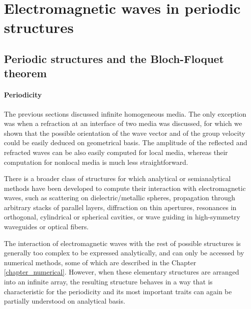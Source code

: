 
\section{Electromagnetic waves in periodic structures}
\subsection{Periodic structures and the Bloch-Floquet theorem}
\paragraph{Periodicity}%
The previous sections discussed infinite homogeneous media. The only exception was when a refraction at an interface of two media was discussed, for which we shown that the possible orientation of the wave vector and of the group velocity could be easily deduced on geometrical basis. The amplitude of the reflected and refracted waves can be also easily computed for local media, whereas their computation for nonlocal media is much less straightforward. 

There is a broader class of structures for which analytical or semianalytical methods have been developed to compute their interaction with electromagnetic waves, such as scattering on dielectric/metallic spheres, propagation through arbitrary stacks of parallel layers, diffraction on thin apertures, resonances in orthogonal, cylindrical or spherical cavities, or wave guiding in high-symmetry waveguides or optical fibers. 

The interaction of electromagnetic waves with the rest of possible structures is generally too complex to be expressed analytically, and can only be accessed by numerical methods, some of which are described in the Chapter \ref{chapter_numerical}. However, when these elementary structures are arranged into an infinite array, the resulting structure behaves in a way that is characteristic for the periodicity and its most important traits can again be partially understood on analytical basis.

